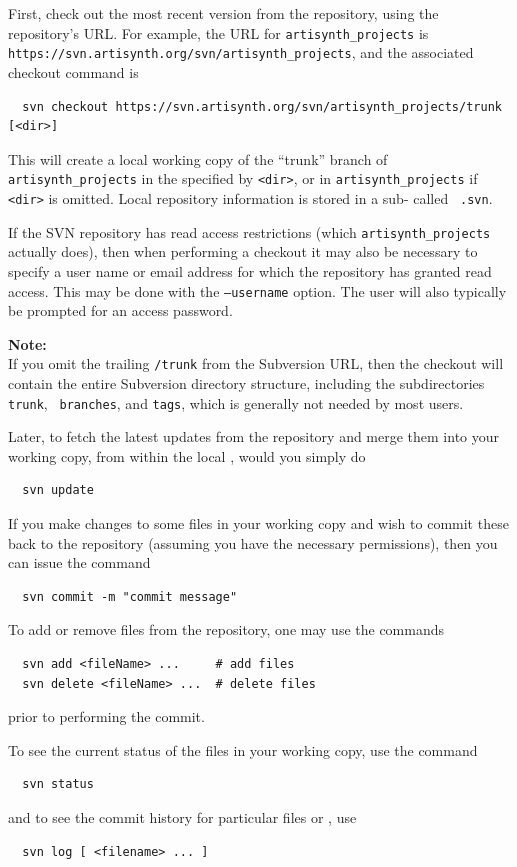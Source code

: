 First, check out the most recent version from the repository, using
the repository's URL. For example, the URL for {\tt artisynth\_projects}
is {\tt https://svn.artisynth.org/svn/artisynth\_projects},
and the associated checkout command is
\begin{verbatim}
  svn checkout https://svn.artisynth.org/svn/artisynth_projects/trunk [<dir>]
\end{verbatim}
This will create a local working copy of the ``trunk'' branch of {\tt
artisynth\_projects} in the \directory{} specified by {\tt <dir>},
or in {\tt artisynth\_projects} if {\tt <dir>} is omitted. Local
repository information is stored in a sub-\directory{} called {\tt
.svn}.

If the SVN repository has read access restrictions (which 
{\tt artisynth\_projects} actually does), then when performing a
checkout it may also be necessary to specify a user name or email
address for which the repository has granted read access. This may be
done with the {\tt --username} option. The user will also
typically be prompted for an access password.

\begin{sideblock}
{\bf Note:}\\ 
If you omit the trailing {\tt /trunk} from the
Subversion URL, then the checkout will contain the entire Subversion
directory structure, including the subdirectories {\tt trunk}, {\tt
branches}, and {\tt tags}, which is generally not needed by most
users.
\end{sideblock}

Later, to fetch the latest updates from the repository and
merge them into your working copy, from within the local
\directory{}, would you simply do
\begin{verbatim}
  svn update
\end{verbatim}

If you make changes to some files in your working copy and wish to
commit these back to the repository (assuming you have the necessary
permissions), then you can issue the command
\begin{verbatim}
  svn commit -m "commit message"
\end{verbatim}
To add or remove files from the repository, one may use
the commands
\begin{verbatim}
  svn add <fileName> ...     # add files
  svn delete <fileName> ...  # delete files
\end{verbatim}
prior to performing the commit.

To see the current status of the files in your working copy,
use the command
\begin{verbatim}
  svn status
\end{verbatim}
and to see the commit history for particular files or \directories{},
use 
\begin{verbatim}
  svn log [ <filename> ... ]
\end{verbatim}

